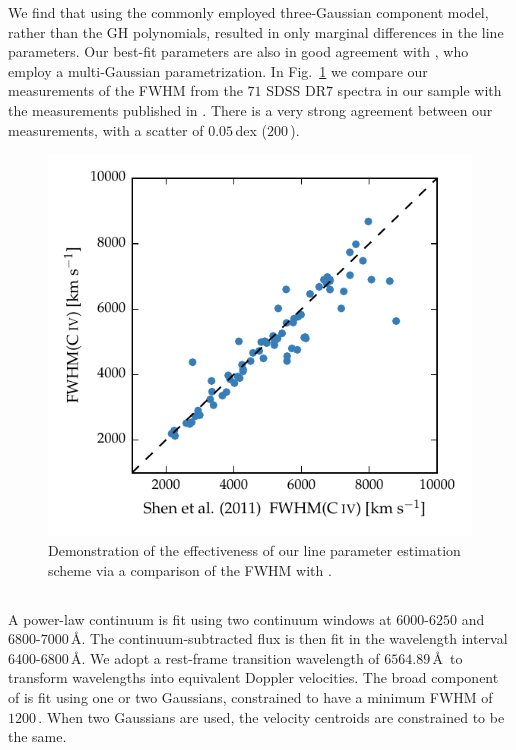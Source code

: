 We find that using the commonly employed three-Gaussian component model, rather than the GH polynomials, resulted in only marginal differences in the line parameters. 
Our best-fit parameters are also in good agreement with \citet{shen11}, who employ a multi-Gaussian parametrization. 
In Fig.~\ref{fig:shen_comparison_civ} we compare our measurements of the  FWHM from the $71$ SDSS DR$7$ spectra in our sample with the measurements published in \citet{shen11}. 
There is a very strong agreement between our measurements, with a scatter of $0.05$\,dex ($200$\,\kms). 

\begin{figure}
    \centering 
    \includegraphics[width=0.8\linewidth]{figures/chapter03/shen_comparison_civ.pdf} 
    \caption{Demonstration of the effectiveness of our line parameter estimation scheme via a comparison of the  FWHM with \citet{shen11}.} 
    \label{fig:shen_comparison_civ}
\end{figure}

\subsection{\ha}
\label{sec:ha}


A power-law continuum is fit using two continuum windows at $6000$-$6250$ and $6800$-$7000$\,\AA. 
The continuum-subtracted flux is then fit in the wavelength interval 6400-6800\,\AA. 
We adopt a rest-frame transition wavelength of $6564.89$\,\AA\, to transform wavelengths into equivalent Doppler velocities. 
The broad component of \ha is fit using one or two Gaussians, constrained to have a minimum FWHM of $1200$\,\kms. When two Gaussians are used, the velocity centroids are constrained to be the same.


